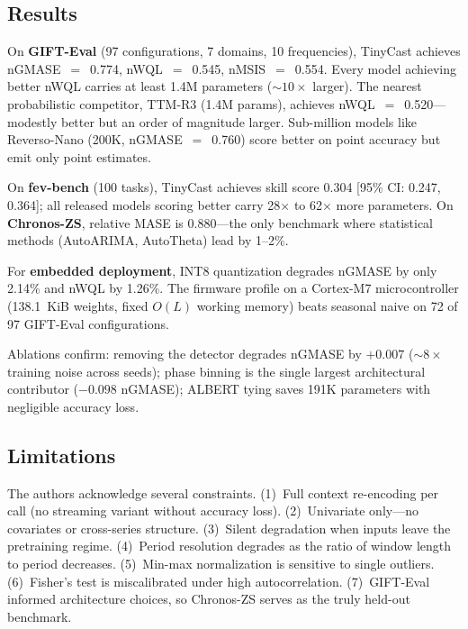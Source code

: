 \documentclass[11pt,a4paper]{article}
\begin{document}
\subsection{Results}
On \textbf{GIFT-Eval} (97 configurations, 7 domains, 10 frequencies), TinyCast achieves nGMASE~$=$~0.774, nWQL~$=$~0.545, nMSIS~$=$~0.554. Every model achieving better nWQL carries at least 1.4M parameters (${\sim}10\times$ larger). The nearest probabilistic competitor, TTM-R3 (1.4M params), achieves nWQL~$=$~0.520---modestly better but an order of magnitude larger. Sub-million models like Reverso-Nano (200K, nGMASE~$=$~0.760) score better on point accuracy but emit only point estimates.

On \textbf{fev-bench} (100 tasks), TinyCast achieves skill score 0.304 [95\% CI: 0.247, 0.364]; all released models scoring better carry 28$\times$ to 62$\times$ more parameters. On \textbf{Chronos-ZS}, relative MASE is 0.880---the only benchmark where statistical methods (AutoARIMA, AutoTheta) lead by 1--2\%.

For \textbf{embedded deployment}, INT8 quantization degrades nGMASE by only 2.14\% and nWQL by 1.26\%. The firmware profile on a Cortex-M7 microcontroller (138.1~KiB weights, fixed $O(L)$ working memory) beats seasonal naive on 72 of 97 GIFT-Eval configurations.

Ablations confirm: removing the detector degrades nGMASE by $+0.007$ (${\sim}8\times$ training noise across seeds); phase binning is the single largest architectural contributor ($-0.098$ nGMASE); ALBERT tying saves 191K parameters with negligible accuracy loss.

\subsection{Limitations}
The authors acknowledge several constraints. (1)~Full context re-encoding per call (no streaming variant without accuracy loss). (2)~Univariate only---no covariates or cross-series structure. (3)~Silent degradation when inputs leave the pretraining regime. (4)~Period resolution degrades as the ratio of window length to period decreases. (5)~Min-max normalization is sensitive to single outliers. (6)~Fisher's test is miscalibrated under high autocorrelation. (7)~GIFT-Eval informed architecture choices, so Chronos-ZS serves as the truly held-out benchmark.
\end{document}
